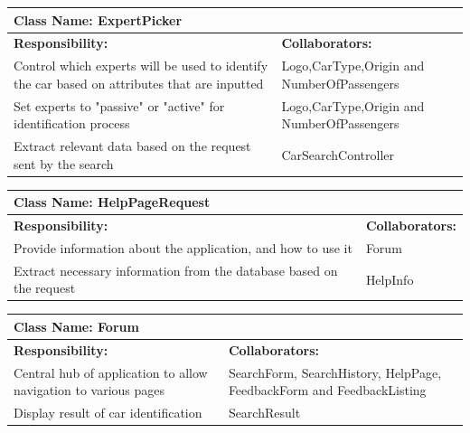 \documentclass[12pt]{article}
\begin{document}
	\begin{table}[ht]
		\centering
		\begin{tabular}{|p{5cm}|p{5cm}|}
		\hline
		 \multicolumn{2}{|l|}{\textbf{Class Name:} ExpertPicker} \\
		\hline
		\textbf{Responsibility:} & \textbf{Collaborators:} \\
		\hline
		Control which experts will be used to identify the car based on attributes that are inputted & Logo,CarType,Origin and NumberOfPassengers\\
		\hline
		Set experts to "passive" or "active" for identification process & Logo,CarType,Origin and NumberOfPassengers\\
		\hline
		Extract relevant data based on the request sent by the search & CarSearchController\\
		\hline
		\end{tabular}
	\end{table}

	\begin{table}[ht]
		\centering
		\begin{tabular}{|p{5cm}|p{5cm}|}
			\hline
			\multicolumn{2}{|l|}{\textbf{Class Name:} HelpPageRequest} \\
			\hline
			\textbf{Responsibility:} & \textbf{Collaborators:} \\
			\hline
			Provide information about the application, and how to use it & Forum\\
			\hline
			Extract necessary information from the database based on the request & HelpInfo\\
			\hline
		\end{tabular}
	\end{table}

	\begin{table}[ht]
		\centering
		\begin{tabular}{|p{5cm}|p{5cm}|}
			\hline
			\multicolumn{2}{|l|}{\textbf{Class Name:} Forum} \\
			\hline
			\textbf{Responsibility:} & \textbf{Collaborators:} \\
			\hline
			Central hub of application to allow navigation to various pages & SearchForm, SearchHistory, HelpPage, FeedbackForm and FeedbackListing\\
			\hline
			Display result of car identification & SearchResult\\
			\hline
		\end{tabular}
	\end{table}
\end{document}
